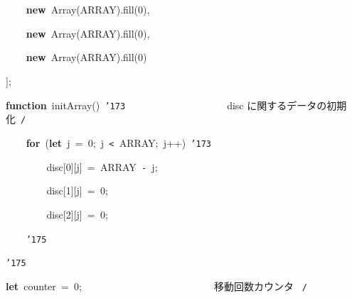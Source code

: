\documentclass[a4paper,10pt]{article}
\def\mc{\relax}
\begin{document}
\noindent
\mbox{}{\tt\mc \ }{\tt\mc \ }{\tt\mc \ }{\tt\mc \ }\textbf{new}{\tt\mc \ }Array(ARRAY).fill(0),

\noindent
\mbox{}{\tt\mc \ }{\tt\mc \ }{\tt\mc \ }{\tt\mc \ }\textbf{new}{\tt\mc \ }Array(ARRAY).fill(0),

\noindent
\mbox{}{\tt\mc \ }{\tt\mc \ }{\tt\mc \ }{\tt\mc \ }\textbf{new}{\tt\mc \ }Array(ARRAY).fill(0)

\noindent
\mbox{}];

\noindent
\mbox{}\hfill

\noindent
\mbox{}\textbf{function}{\tt\mc \ }initArray(){\tt\mc \ }{\tt\char'173}{\tt\mc \ }{\tt\mc \ }{\tt\mc \ }{\tt\mc \ }{\tt\mc \ }{\tt\mc \ }{\tt\mc \ }{\tt\mc \ }{\tt\mc \ }{\tt\mc \ }{\tt\mc \ }{\tt\mc \ }{\tt\mc \ }{\tt\mc \ }{\tt\mc \ }{\tt\mc \ }{\tt\mc \ }{\tt\mc \ }\rm\mc {\tt /}{\tt *}\  \ disc に関するデータの初期化\hfill \rm\mc \ {\tt *}{\tt /}
\tt\mc 

\noindent
\mbox{}{\tt\mc \ }{\tt\mc \ }{\tt\mc \ }{\tt\mc \ }\textbf{for}{\tt\mc \ }(\textbf{let}{\tt\mc \ }j{\tt\mc \ }={\tt\mc \ }0;{\tt\mc \ }j{\tt\mc \ }{\tt <}{\tt\mc \ }ARRAY;{\tt\mc \ }j++){\tt\mc \ }{\tt\char'173}

\noindent
\mbox{}{\tt\mc \ }{\tt\mc \ }{\tt\mc \ }{\tt\mc \ }{\tt\mc \ }{\tt\mc \ }{\tt\mc \ }{\tt\mc \ }disc[0][j]{\tt\mc \ }={\tt\mc \ }ARRAY{\tt\mc \ }{\tt -}{\tt\mc \ }j;

\noindent
\mbox{}{\tt\mc \ }{\tt\mc \ }{\tt\mc \ }{\tt\mc \ }{\tt\mc \ }{\tt\mc \ }{\tt\mc \ }{\tt\mc \ }disc[1][j]{\tt\mc \ }={\tt\mc \ }0;

\noindent
\mbox{}{\tt\mc \ }{\tt\mc \ }{\tt\mc \ }{\tt\mc \ }{\tt\mc \ }{\tt\mc \ }{\tt\mc \ }{\tt\mc \ }disc[2][j]{\tt\mc \ }={\tt\mc \ }0;

\noindent
\mbox{}{\tt\mc \ }{\tt\mc \ }{\tt\mc \ }{\tt\mc \ }{\tt\char'175}

\noindent
\mbox{}{\tt\char'175}

\noindent
\mbox{}\hfill

\noindent
\mbox{}\textbf{let}{\tt\mc \ }counter{\tt\mc \ }={\tt\mc \ }0;{\tt\mc \ }{\tt\mc \ }{\tt\mc \ }{\tt\mc \ }{\tt\mc \ }{\tt\mc \ }{\tt\mc \ }{\tt\mc \ }{\tt\mc \ }{\tt\mc \ }{\tt\mc \ }{\tt\mc \ }{\tt\mc \ }{\tt\mc \ }{\tt\mc \ }{\tt\mc \ }{\tt\mc \ }{\tt\mc \ }{\tt\mc \ }{\tt\mc \ }{\tt\mc \ }{\tt\mc \ }{\tt\mc \ }{\tt\mc \ }\rm\mc {\tt /}{\tt *}\  \ 移動回数カウンタ \hfill \rm\mc \ {\tt *}{\tt /}
\tt\mc 

\noindent
\mbox{}\hfill
\end{document}
